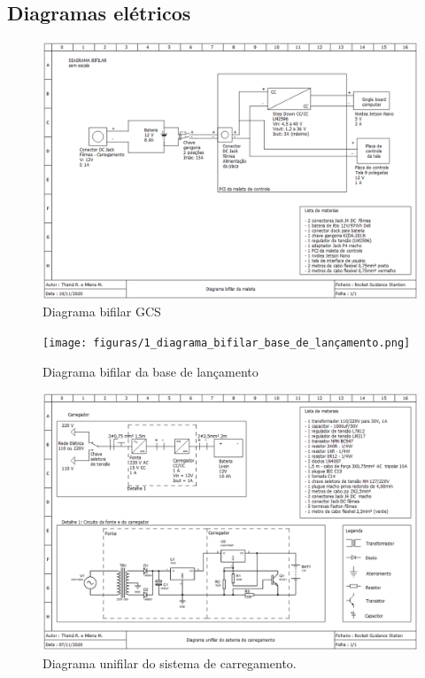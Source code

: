 \begin{apendicesenv}
\chapter{Diagramas elétricos}
\label{diag_eletrico}

\begin{figure}[H]
    \centering
    \includegraphics[width=1.3\textwidth, angle=270]{figuras/1_diagrama_bifilar_da_maleta.png}
    \caption{Diagrama bifilar GCS}
    \label{fig:diagrama_bifilar_01}
\end{figure}

\begin{figure}[H]
    \centering
    \texttt{[image: figuras/1\_diagrama\_bifilar\_base\_de\_lançamento.png]}
    \caption{Diagrama bifilar da base de lançamento}
    \label{fig:diagrama_bifilar_02}
\end{figure}

\begin{figure}[H]
    \centering
    \includegraphics[width=1.3\textwidth, angle=270]{figuras/1_diagrama_unifilar_do_sistema_de_carregamento.png}
    \caption{Diagrama unifilar do sistema de carregamento.}
    \label{fig:diagrama_unifilar_01}
\end{figure}


\end{apendicesenv}
